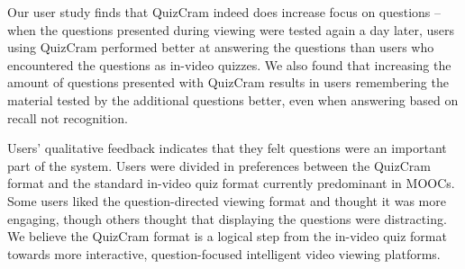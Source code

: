 \documentclass{chi-ext}
\begin{document}
Our user study finds that QuizCram indeed does increase focus on questions -- when the questions presented during viewing were tested again a day later, users using QuizCram performed better at answering the questions than users who encountered the questions as in-video quizzes. We also found that increasing the amount of questions presented with QuizCram results in users remembering the material tested by the additional questions better, even when answering based on recall not recognition.

Users' qualitative feedback indicates that they felt questions were an important part of the system. Users were divided in preferences between the QuizCram format and the standard in-video quiz format currently predominant in MOOCs. Some users liked the question-directed viewing format and thought it was more engaging, though others thought that displaying the questions were distracting. We believe the QuizCram format is a logical step from the in-video quiz format towards more interactive, question-focused intelligent video viewing platforms.


\balance



\end{document}
